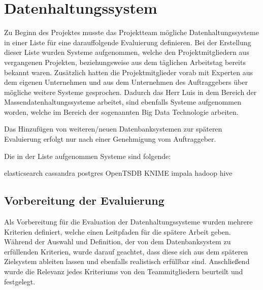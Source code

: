 \section{Datenhaltungssystem}
\label{sec:datenhaltungssystem}
Zu Beginn des Projektes musste das Projektteam mögliche Datenhaltungssysteme in
einer Liste für eine darauffolgende Evaluierung definieren. Bei der Erstellung
dieser Liste wurden Systeme aufgenommen, welche den Projektmitgliedern aus
vergangenen Projekten, beziehungsweise aus dem täglichen Arbeitstag bereits
bekannt waren. Zusätzlich hatten die Projektmitglieder vorab mit Experten aus
dem eigenen Unternehmen und aus dem Unternehmen des Auftraggebers über mögliche
weitere Systeme gesprochen. Dadurch das Herr Luis in dem Bereich der
Massendatenhaltungssysteme arbeitet, sind ebenfalls Systeme aufgenommen worden,
welche im Bereich der sogenannten Big Data Technologie arbeiten.

Das Hinzufügen von weiteren/neuen Datenbanksystemen zur späteren
Evaluierung erfolgt nur nach einer Genehmigung vom Auftraggeber.

Die in der Liste aufgenommen Systeme sind folgende:

\begin{outline}
  \1 elasticsearch
  \1 cassandra
  \1 postgres
  \1 OpenTSDB
  \1 KNIME
  \1 impala
  \1 hadoop
  \1 hive
\end{outline}
\nl%

\subsection{Vorbereitung der Evaluierung}
\label{subsec:DBS_vorbereitung_der_evaluierung}
Als Vorbereitung für die Evaluation der Datenhaltungssysteme wurden mehrere
Kriterien definiert, welche einen Leitpfaden für die spätere Arbeit geben.
Während der Auswahl und Definition, der von dem Datenbanksystem zu erfüllenden
Kriterien, wurde darauf geachtet, dass diese sich aus dem späteren Zielsystem
ableiten lassen und ebenfalls realistisch erfüllbar sind. Anschließend wurde
die Relevanz jedes Kriteriums von den Teammitgliedern beurteilt und festgelegt.

